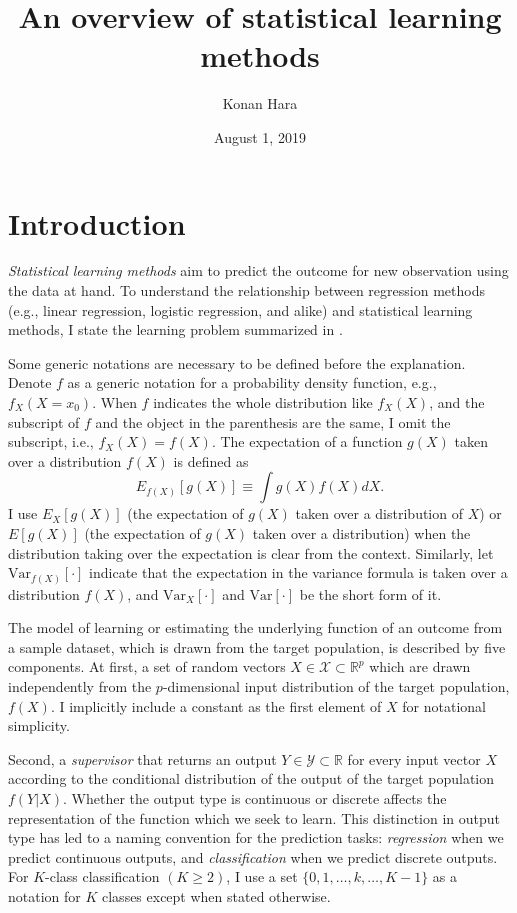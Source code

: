 \documentclass[12pt]{article}
\title{An overview of statistical learning methods}
\author{Konan Hara}
\date{August 1, 2019}
\newcommand{\Var}{\mathrm{Var}}
\begin{document}
\maketitle{}

\doublespacing

\fancyhf{}
\fancyhead[L]{\leftmark}
\fancyfoot[C]{\thepage}

\tableofcontents{}

\clearpage

\section{Introduction}
{\it Statistical learning methods} aim to predict the outcome for new observation using the data at hand. To understand the relationship between regression methods (e.g., linear regression, logistic regression, and alike) and statistical learning methods, I state the learning problem summarized in \textcite{Vapnik1999}.

Some generic notations are necessary to be defined before the explanation. Denote $f$ as a generic notation for a probability density function, e.g., $f_X(X=x_0)$. When $f$ indicates the whole distribution like $f_X(X)$, and the subscript of $f$ and the object in the parenthesis are the same, I omit the subscript, i.e., $f_X(X) = f(X)$. The expectation of a function $g(X)$ taken over a distribution $f(X)$ is defined as
\begin{equation*}
E_{f(X)}[g(X)] \equiv \int g(X) f(X) dX.
\end{equation*}
I use $E_X[g(X)]$ (the expectation of $g(X)$ taken over a distribution of $X$) or $E[g(X)]$ (the expectation of $g(X)$ taken over a distribution) when the distribution taking over the expectation is clear from the context. Similarly, let $\Var_{f(X)}[\cdot]$ indicate that the expectation in the variance formula is taken over a distribution $f(X)$, and $\Var_X[\cdot]$ and $\Var[\cdot]$ be the short form of it.

The model of learning or estimating the underlying function of an outcome from a sample dataset, which is drawn from the target population, is described by five components. At first, a set of random vectors $X \in \mathcal{X} \subset \mathbb{R}^p$ which are drawn independently from the $p$-dimensional input distribution of the target population, $f(X)$. I implicitly include a constant as the first element of $X$ for notational simplicity.

Second, a {\it supervisor} that returns an output $Y \in \mathcal{Y} \subset \mathbb{R}$ for every input vector $X$ according to the conditional distribution of the output of the target population $f(Y|X)$. Whether the output type is continuous or discrete affects the representation of the function which we seek to learn. This distinction in output type has led to a naming convention for the prediction tasks: {\it regression} when we predict continuous outputs, and {\it classification} when we predict discrete outputs. For $K$-class classification $(K \geq 2)$, I use a set $\{0,1,\dots,k,\dots,K-1\}$ as a notation for $K$ classes except when stated otherwise.
\end{document}
